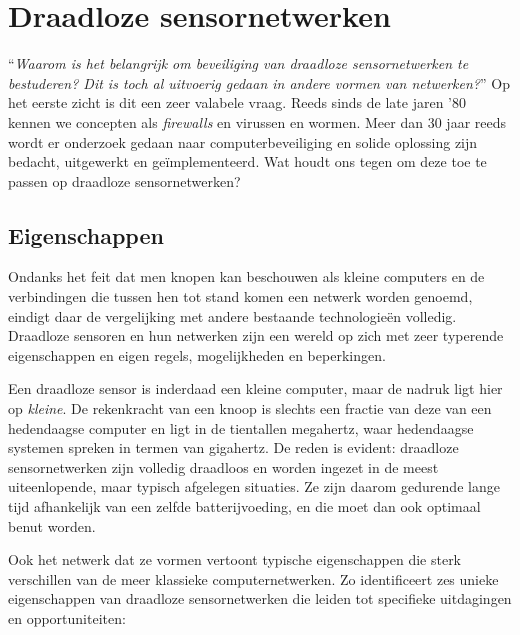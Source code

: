 
\section{Draadloze sensornetwerken}
\label{section:landscape}

``\emph{Waarom is het belangrijk om beveiliging van draadloze sensornetwerken
te bestuderen? Dit is toch al uitvoerig gedaan in andere vormen van
netwerken?}'' Op het eerste zicht is dit een zeer valabele vraag. Reeds sinds
de late jaren '80 kennen we concepten als \emph{firewalls} en virussen en
wormen. Meer dan 30 jaar reeds wordt er onderzoek gedaan naar
computerbeveiliging en solide oplossing zijn bedacht, uitgewerkt en
ge\"implementeerd. Wat houdt ons tegen om deze toe te passen op draadloze
sensornetwerken?

\subsection{Eigenschappen}

Ondanks het feit dat men knopen kan beschouwen als kleine computers en de
verbindingen die tussen hen tot stand komen een netwerk worden genoemd, eindigt
daar de vergelijking met andere bestaande technologie\"en volledig. Draadloze
sensoren en hun netwerken zijn een wereld op zich met zeer typerende
eigenschappen en eigen regels, mogelijkheden en beperkingen.

Een draadloze sensor is inderdaad een kleine computer, maar de nadruk ligt hier
op \emph{kleine}. De rekenkracht van een knoop is slechts een fractie van deze
van een hedendaagse computer en ligt in de tientallen megahertz, waar
hedendaagse systemen spreken in termen van gigahertz. De reden is evident:
draadloze sensornetwerken zijn volledig draadloos en worden ingezet in de meest
uiteenlopende, maar typisch afgelegen situaties. Ze zijn daarom gedurende lange
tijd afhankelijk van een zelfde batterijvoeding, en die moet dan ook optimaal
benut worden.

Ook het netwerk dat ze vormen vertoont typische eigenschappen die sterk
verschillen van de meer klassieke computernetwerken. Zo identificeert
\cite{blilat2012wireless} zes unieke eigenschappen van draadloze
sensornetwerken die leiden tot specifieke uitdagingen en opportuniteiten:

